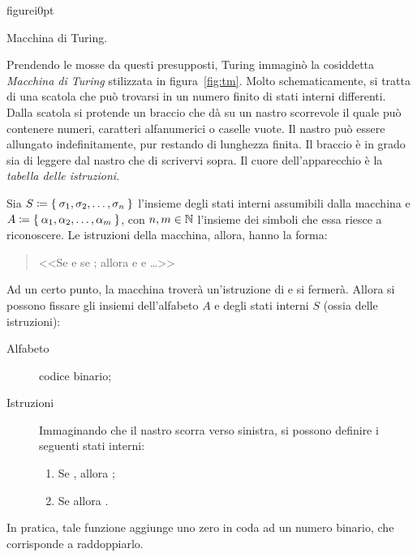 \begin{wrapfloat}{figure}{i}{0pt}
\begin{minipage}{.5\columnwidth}
	\centering

	\caption{Macchina di Turing.}
	\label{fig:tm}
\end{minipage}
\end{wrapfloat}
Prendendo  le mosse da questi presupposti, Turing immaginò la cosiddetta \emph{Macchina di Turing} stilizzata in figura~\ref{fig:tm}.
Molto schematicamente, si tratta di una scatola che può trovarsi in un numero finito di stati interni differenti.
Dalla scatola si protende un braccio che dà su un nastro scorrevole il quale può contenere numeri, caratteri alfanumerici o caselle vuote.
Il nastro può essere allungato indefinitamente, pur restando di lunghezza finita.
Il braccio è in grado sia di leggere dal nastro che di scrivervi sopra.
Il cuore dell'apparecchio è la \emph{tabella delle istruzioni}.

Sia $S\coloneqq \Set{\sigma_1,\sigma_2,\dots,\sigma_n}$ l'insieme degli stati interni assumibili dalla macchina e $A\coloneqq\Set{\alpha_1,\alpha_2,\dots,\alpha_m}$, con $n,m\in\mathbb{N}$ l'insieme dei simboli che essa riesce a riconoscere.
Le istruzioni della macchina, allora, hanno la forma:
\begin{quote}
<<Se  e se ; allora  e  e \dots>>
\end{quote}
Ad un certo punto, la macchina troverà un'istruzione di  e si fermerà.
Allora si possono fissare gli insiemi dell'alfabeto $A$ e degli stati interni $S$ (ossia delle istruzioni):
\begin{description}
	\item[Alfabeto] codice binario;
	\item[Istruzioni] Immaginando che il nastro scorra verso sinistra, si possono definire i seguenti stati interni:
		\begin{enumerate}
			\item
Se , allora ;
			\item
Se  allora .
		\end{enumerate}
\end{description}
In pratica, tale funzione aggiunge uno zero in coda ad un numero binario, che corrisponde a raddoppiarlo.

